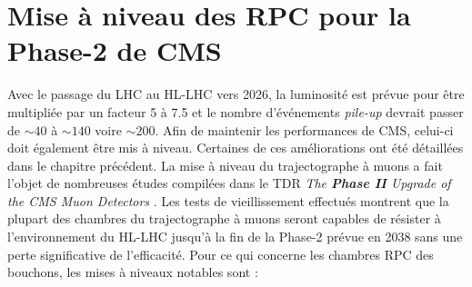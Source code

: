 \section{Mise à niveau des RPC pour la Phase-2 de CMS}
Avec le passage du LHC au HL-LHC vers 2026, la luminosité est prévue pour être multipliée par un facteur \num{5} à \num{7.5} et le nombre d'événements \textit{pile-up} devrait passer de $\sim 40$ à $\sim 140$ voire $\sim 200$. Afin de maintenir les performances de CMS, celui-ci doit également être mis à niveau. Certaines de ces améliorations ont été détaillées dans le chapitre précédent. La mise à niveau du trajectographe à muons a fait l'objet de nombreuses études compilées dans le TDR \textit{The \textbf{Phase II} Upgrade of the CMS Muon Detectors} \cite{Lourenco:2283189}. Les tests de vieillissement effectués montrent que la plupart des chambres du trajectographe à muons seront capables de résister à l'environnement du HL-LHC jusqu'à la fin de la Phase-2 prévue en \num{2038} sans une perte significative de l'efficacité. Pour ce qui concerne les chambres RPC des bouchons, les mises à niveaux notables sont :

